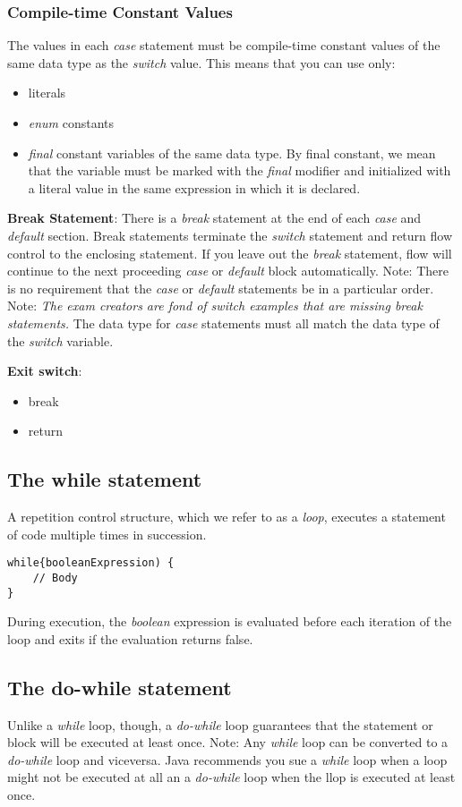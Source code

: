 \documentclass{article}
\begin{document}
\subsubsection{Compile-time Constant Values}
The values in each \emph{case} statement must be compile-time constant values of the same data type as the \emph{switch} value. This means that you can use only:
\begin{itemize}
	\item literals
	\item \emph{enum} constants
	\item \emph{final} constant variables of the same data type. By final constant, we mean that the variable must be marked with the \emph{final} modifier and initialized with a literal value in the same expression in which it is declared.
\end{itemize}
\textbf{Break Statement}: There is a \emph{break} statement at the end of each \emph{case} and \emph{default} section. Break statements terminate the \emph{switch} statement and return flow control to the enclosing statement. If you leave out the \emph{break} statement, flow will continue to the next proceeding \emph{case} or \emph{default} block automatically.
Note: There is no requirement that the \emph{case} or \emph{default} statements be in a particular order.
Note: \emph{The exam creators are fond of switch examples that are missing break statements.}
The data type for \emph{case} statements must all match the data type of the \emph{switch} variable.

\textbf{Exit switch}:
\begin{itemize}
	\item break
	\item return
\end{itemize}

\subsection{The while statement}
A repetition control structure, which we refer to as a \emph{loop}, executes a statement of code multiple times in succession.
\begin{lstlisting}
while{booleanExpression) {
	// Body
}
\end{lstlisting}

During execution, the \emph{boolean} expression is evaluated before each iteration of the loop and exits if the evaluation returns false.

\subsection{The do-while statement}
Unlike a \emph{while} loop, though, a \emph{do-while} loop guarantees that the statement or block will be executed at least once.
Note: Any \emph{while} loop can be converted to a \emph{do-while} loop and viceversa.
Java recommends you sue a \emph{while} loop when a loop might not be executed at all an a \emph{do-while} loop when the llop is executed at least once.
\end{document}

